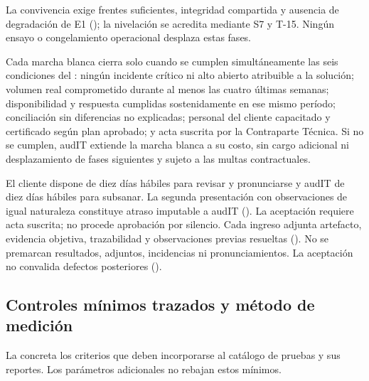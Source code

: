 La convivencia exige frentes suficientes, integridad compartida y ausencia de degradación de E1 (); la nivelación se acredita mediante S7 y T-15. Ningún ensayo o congelamiento operacional desplaza estas fases.

Cada marcha blanca cierra solo cuando se cumplen simultáneamente las seis condiciones del : ningún incidente crítico ni alto abierto atribuible a la solución; volumen real comprometido durante al menos las cuatro últimas semanas; disponibilidad y respuesta cumplidas sostenidamente en ese mismo período; conciliación sin diferencias no explicadas; personal del cliente capacitado y certificado según plan aprobado; y acta suscrita por la Contraparte Técnica. Si no se cumplen, audIT extiende la marcha blanca a su costo, sin cargo adicional ni desplazamiento de fases siguientes y sujeto a las multas contractuales.

El cliente dispone de diez días hábiles para revisar y pronunciarse y audIT de diez días hábiles para subsanar. La segunda presentación con observaciones de igual naturaleza constituye atraso imputable a audIT (). La aceptación requiere acta suscrita; no procede aprobación por silencio. Cada ingreso adjunta artefacto, evidencia objetiva, trazabilidad y observaciones previas resueltas (). No se premarcan resultados, adjuntos, incidencias ni pronunciamientos. La aceptación no convalida defectos posteriores ().

\subsection{Controles mínimos trazados y método de medición}\label{sec:9-minimos-trazados}

La  concreta los criterios que deben incorporarse al catálogo de pruebas y sus reportes. Los parámetros adicionales no rebajan estos mínimos.

